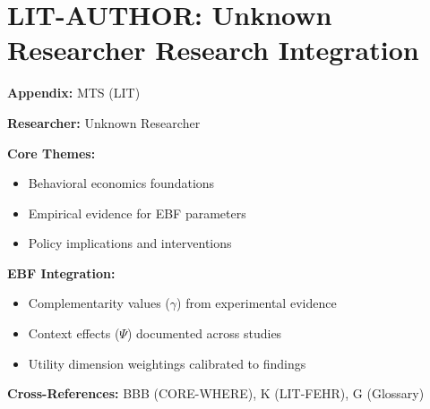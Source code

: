 %
%

\chapter{LIT-AUTHOR: Unknown Researcher Research Integration}
\label{app:mts}

\begin{abstract}
This appendix integrates the research contributions of Unknown Researcher into the
Evidence-Based Framework. It documents key papers, core findings, and their
integration with EBF dimensions including complementarity parameters ($\gamma$),
context factors ($\Psi$), and utility dimensions.
\end{abstract}

\begin{tcolorbox}[colback=blue!5!white, colframe=blue!75!black,
    title=Quick Reference: Unknown Researcher Research]

\textbf{Appendix:} MTS (LIT)

\textbf{Researcher:} Unknown Researcher

\textbf{Core Themes:}
\begin{itemize}[nosep]
\item Behavioral economics foundations
\item Empirical evidence for EBF parameters
\item Policy implications and interventions
\end{itemize}

\textbf{EBF Integration:}
\begin{itemize}[nosep]
\item Complementarity values ($\gamma$) from experimental evidence
\item Context effects ($\Psi$) documented across studies
\item Utility dimension weightings calibrated to findings
\end{itemize}

\textbf{Cross-References:} BBB (CORE-WHERE), K (LIT-FEHR), G (Glossary)
\end{tcolorbox}

